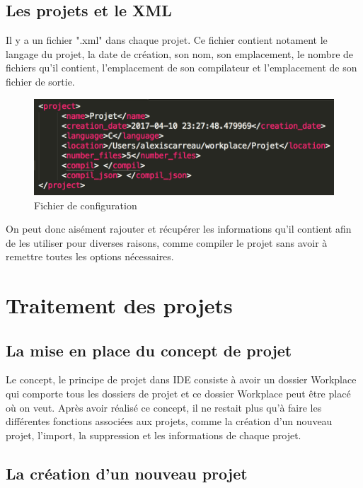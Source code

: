 \documentclass[a4paper,12pt]{article}
\begin{document}
\subsection{Les projets et le XML}

	Il y a un fichier ".xml" dans chaque projet. Ce fichier contient notament le langage du projet, la date de création, son nom, son emplacement, le nombre de fichiers qu'il contient, l'emplacement de son compilateur et l'emplacement de son fichier de sortie.\\
	
	\begin{figure}[h!]
			\begin{center}
				\includegraphics[scale=0.6]{images/imgs_xml/projet_xml.png}
				\caption{Fichier de configuration}
			\end{center}
		\end{figure}
		
		On peut donc aisément rajouter et récupérer les informations qu'il contient afin de les utiliser pour diverses raisons, comme compiler le projet sans avoir à remettre toutes les options nécessaires.
	
\section{Traitement des projets}

\subsection{La mise en place du concept de projet}

Le concept, le principe de projet dans IDE consiste à avoir un dossier Workplace qui comporte tous les dossiers de projet et ce dossier Workplace peut être placé où on veut. Après avoir réalisé ce concept, il ne restait plus qu'à faire les différentes fonctions associées aux projets, comme la création d'un nouveau projet, l'import, la suppression et les informations de chaque projet.
	
\subsection{La création d'un nouveau projet}
		
\end{document}
